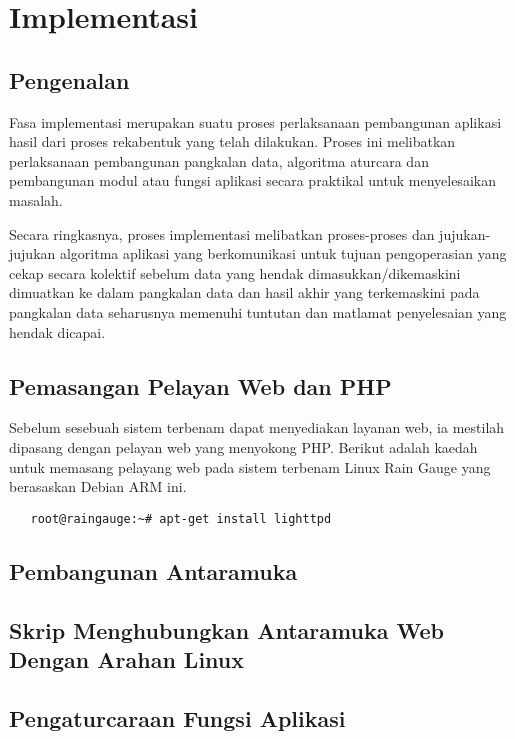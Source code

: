 \chapter{Implementasi}\label{c5}

\section{Pengenalan}
Fasa implementasi merupakan suatu proses perlaksanaan pembangunan aplikasi hasil dari proses rekabentuk yang telah dilakukan. Proses ini melibatkan perlaksanaan pembangunan pangkalan data, algoritma aturcara dan pembangunan modul atau fungsi aplikasi secara praktikal untuk menyelesaikan masalah.

Secara ringkasnya, proses implementasi melibatkan proses-proses dan jujukan-jujukan algoritma aplikasi yang berkomunikasi untuk tujuan pengoperasian yang cekap secara kolektif sebelum data yang hendak dimasukkan/dikemaskini dimuatkan ke dalam pangkalan data dan hasil akhir yang terkemaskini pada pangkalan data seharusnya memenuhi tuntutan dan matlamat penyelesaian yang hendak dicapai.

\section{Pemasangan Pelayan Web dan PHP}
Sebelum sesebuah sistem terbenam dapat menyediakan layanan web, ia mestilah dipasang dengan pelayan web yang menyokong PHP. Berikut adalah kaedah untuk memasang pelayang web pada sistem terbenam Linux Rain Gauge yang berasaskan Debian ARM ini.

{\footnotesize\renewcommand{\baselinestretch}{1.0}
\begin{verbatim}
   root@raingauge:~# apt-get install lighttpd
\end{verbatim}}

\section{Pembangunan Antaramuka}

\section{Skrip Menghubungkan Antaramuka Web Dengan Arahan Linux}

\section{Pengaturcaraan Fungsi Aplikasi}


